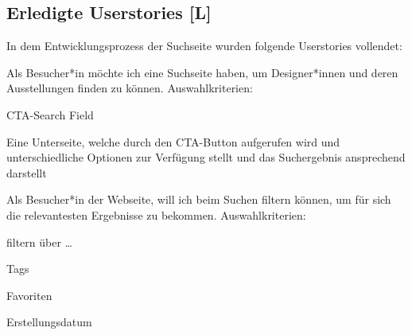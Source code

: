 \subsection{Erledigte Userstories [L]}
In dem Entwicklungsprozess der Suchseite wurden folgende Userstories vollendet:
\begin{compactitem}
  \item Als Besucher*in möchte ich eine Suchseite haben, um Designer*innen und deren Ausstellungen finden zu können. Auswahlkriterien:
    \begin{compactitem}
        \item CTA-Search Field
        \item Eine Unterseite, welche durch den CTA-Button aufgerufen wird und unterschiedliche Optionen zur Verfügung stellt und das Suchergebnis ansprechend darstellt
    \end{compactitem}
    \item  Als Besucher*in der Webseite, will ich beim Suchen filtern können, um für sich die relevantesten Ergebnisse zu bekommen. Auswahlkriterien:
    \begin{compactitem}
        \item filtern über …
        \begin{compactitem}
            \item Tags
            \item Favoriten
            \item Erstellungsdatum
        \end{compactitem}
    \end{compactitem}
\end{compactitem}